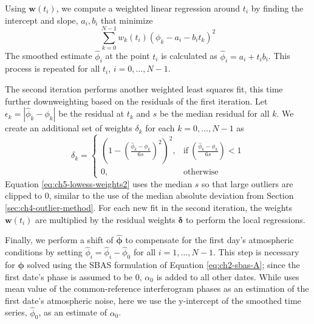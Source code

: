 Using $ \bm{w}(t_i) $, we compute a weighted linear regression around $t_i$ by finding the intercept and slope, $a_i, b_i$ that minimize
\begin{equation}
	\sum_{k=0}^{N-1} w_k(t_i) \left(\phi_k - a_i - b_i t_k \right)^2
\end{equation}
The smoothed estimate $\hat{\phi}_i$ at the point $t_i$ is calculated as $\hat{\phi}_i = a_i + t_i b_i$. This process is repeated for all $t_i$,  $i = 0, \ldots, N-1$.

The second iteration performs another weighted least squares fit, this time further downweighting based on the residuals of the first iteration.
Let $\epsilon_k = \left| \hat{\phi}_k - \phi_k  \right|$ be the residual at $t_k$ and $s$ be the median residual for all $k$. We create an additional set of weights $ \delta_k $ for each $ k = 0, \ldots, N-1$ as
\begin{equation}
	\delta_k = 
	\begin{cases}
		\left( 1 - \left(\frac{ \hat{\phi}_k - \phi_k }{6 s} \right)^2 \right)^2 , & \text{if}\  \left( \frac{ \hat{\phi}_k - \phi_k }{6s} \right) < 1 \\
		0, & \text{otherwise}
	\end{cases}          \label{eq:ch5-lowess-weights2}
\end{equation}
Equation \eqref{eq:ch5-lowess-weights2} uses the median $ s $ so that large outliers are clipped to 0, similar to the use of the median absolute deviation from Section \ref{sec:ch4-outlier-method}. For each new fit in the second iteration, the weights $ \bm{w}(t_i) $ are multiplied by the residual weights $\bm{\delta}$ to perform the local regressions.

Finally, we perform a shift of $ \bm{\hat{\phi}} $ to compensate for the first day's atmospheric conditions by setting $ \hat{\phi}_i = \hat{\phi}_i - \hat{\phi}_0 $ for all $ i = 1, \ldots, N-1 $.
This step is necessary for $ \bm{\phi} $ solved using the SBAS formulation of Equation \eqref{eq:ch2-sbas-A}; since the first date's phase is assumed to be 0, $ \alpha_0 $ is added to all other dates.
While \cite{Ferretti2000NonlinearSubsidenceRate} uses mean value of the common-reference interferogram phases as an estimation of the first date's atmospheric noise, here we use the y-intercept of the smoothed time series, $ \hat{\phi}_0 $, as an estimate of $ \alpha_0 $. 


